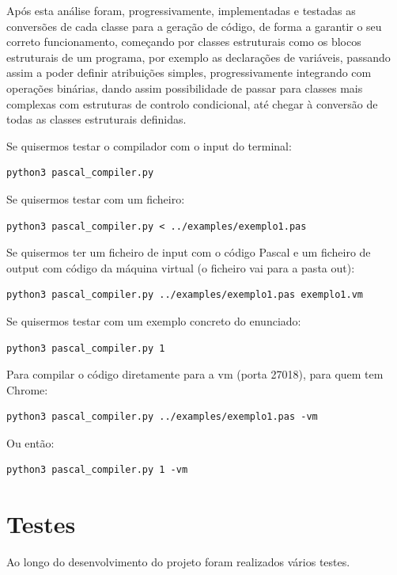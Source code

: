 \documentclass[12pt,a4paper]{report}
\begin{document}
Após esta análise foram, progressivamente, implementadas e testadas as conversões de cada classe para a geração de código, de forma a garantir o seu correto funcionamento, começando por classes estruturais
como os blocos estruturais de um programa, por exemplo as declarações de variáveis, passando assim a poder definir atribuições simples, progressivamente integrando com operações binárias, dando assim possibilidade
de passar para classes mais complexas com estruturas de controlo condicional, até chegar à conversão de todas as classes estruturais definidas.

\vspace{1em}

Se quisermos testar o compilador com o input do terminal:
\begin{verbatim}
python3 pascal_compiler.py
\end{verbatim}

Se quisermos testar com um ficheiro:
\begin{verbatim}
python3 pascal_compiler.py < ../examples/exemplo1.pas
\end{verbatim}

Se quisermos ter um ficheiro de input com o código Pascal e um ficheiro de output com código da máquina virtual (o ficheiro vai para a pasta out):
\begin{verbatim}
python3 pascal_compiler.py ../examples/exemplo1.pas exemplo1.vm
\end{verbatim}

Se quisermos testar com um exemplo concreto do enunciado:
\begin{verbatim}
python3 pascal_compiler.py 1
\end{verbatim}

Para compilar o código diretamente para a vm (porta 27018), para quem tem Chrome:
\begin{verbatim}
python3 pascal_compiler.py ../examples/exemplo1.pas -vm
\end{verbatim}

Ou então:

\begin{verbatim}
python3 pascal_compiler.py 1 -vm
\end{verbatim}

\chapter{Testes}

Ao longo do desenvolvimento do projeto foram realizados vários testes.
\end{document}
